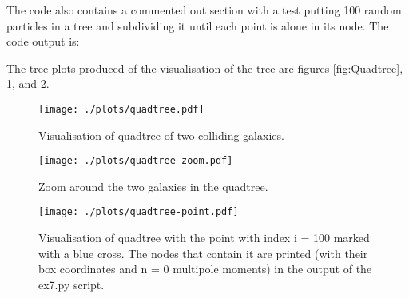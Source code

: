 \documentclass{article}
\begin{document}
The code also contains a commented out section with a test putting 100 random particles in a tree and subdividing it until each point is alone in its node. The code output is:


The tree plots produced of the visualisation of the tree are figures \ref{fig:Quadtree}, \ref{fig:Quadtree-zoom}, and \ref{fig:Quadtree-point}.

\begin{figure}[!h]
\centering
\begin{minipage}[t]{7.8cm}
    \centering
    \texttt{[image: ./plots/quadtree.pdf]}
    \caption{Visualisation of quadtree of two colliding galaxies.}
    \label{fig:Quadtree}
\end{minipage}
\qquad
\begin{minipage}[t]{7.8cm}
    \centering
    \texttt{[image: ./plots/quadtree-zoom.pdf]}
    \caption{Zoom around the two galaxies in the quadtree.}
    \label{fig:Quadtree-zoom}
\end{minipage}
\end{figure}

\begin{figure}
    \centering
    \texttt{[image: ./plots/quadtree-point.pdf]}
    \caption{Visualisation of quadtree with the point with index i = 100 marked with a blue cross. The nodes that contain it are printed (with their box coordinates and n = 0 multipole moments) in the output of the ex7.py script.}
    \label{fig:Quadtree-point}
\end{figure}
\end{document}
